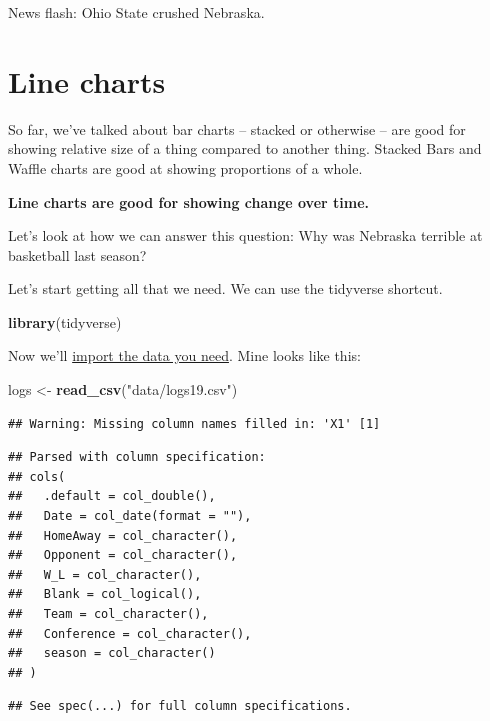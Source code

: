 \documentclass[]{book}
\newenvironment{Shaded}{\begin{snugshade}}{\end{snugshade}}
\newcommand{\KeywordTok}[1]{\textcolor[rgb]{0.13,0.29,0.53}{\textbf{#1}}}
\newcommand{\NormalTok}[1]{#1}
\newcommand{\StringTok}[1]{\textcolor[rgb]{0.31,0.60,0.02}{#1}}
\begin{document}
News flash: Ohio State crushed Nebraska.

\hypertarget{line-charts}{%
\chapter{Line charts}\label{line-charts}}

So far, we've talked about bar charts -- stacked or otherwise -- are good for showing relative size of a thing compared to another thing. Stacked Bars and Waffle charts are good at showing proportions of a whole.

\textbf{Line charts are good for showing change over time.}

Let's look at how we can answer this question: Why was Nebraska terrible at basketball last season?

Let's start getting all that we need. We can use the tidyverse shortcut.

\begin{Shaded}
\begin{Highlighting}[]
\KeywordTok{library}\NormalTok{(tidyverse)}
\end{Highlighting}
\end{Shaded}

Now we'll \href{https://unl.box.com/s/a8m91bro10t89watsyo13yjegb1fy009}{import the data you need}. Mine looks like this:

\begin{Shaded}
\begin{Highlighting}[]
\NormalTok{logs <-}\StringTok{ }\KeywordTok{read_csv}\NormalTok{(}\StringTok{"data/logs19.csv"}\NormalTok{)}
\end{Highlighting}
\end{Shaded}

\begin{verbatim}
## Warning: Missing column names filled in: 'X1' [1]
\end{verbatim}

\begin{verbatim}
## Parsed with column specification:
## cols(
##   .default = col_double(),
##   Date = col_date(format = ""),
##   HomeAway = col_character(),
##   Opponent = col_character(),
##   W_L = col_character(),
##   Blank = col_logical(),
##   Team = col_character(),
##   Conference = col_character(),
##   season = col_character()
## )
\end{verbatim}

\begin{verbatim}
## See spec(...) for full column specifications.
\end{verbatim}
\end{document}
